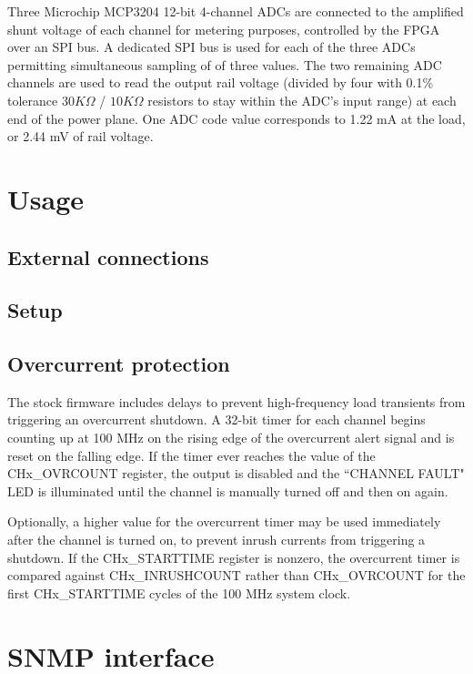 \documentclass{article}
\begin{document}
Three Microchip MCP3204 12-bit 4-channel ADCs are connected to the amplified shunt voltage of each channel for metering
purposes, controlled by the FPGA over an SPI bus. A dedicated SPI bus is used for each of the three ADCs permitting
simultaneous sampling of of three values. The two remaining ADC channels are used to read the output rail voltage
(divided by four with 0.1\% tolerance $30K\Omega$ / $10K\Omega$ resistors to stay within the ADC's input range) at each
end of the power plane. One ADC code value corresponds to 1.22 mA at the load, or 2.44 mV of rail voltage.

\pagebreak
\section{Usage}

\subsection{External connections}

\subsection{Setup}

\subsection{Overcurrent protection}

The stock firmware includes delays to prevent high-frequency load transients from triggering an overcurrent 
shutdown. A 32-bit timer for each channel begins counting up at 100 MHz on the rising edge of the overcurrent alert 
signal and is reset on the falling edge. If the timer ever reaches the value of the CHx\_OVRCOUNT register, the 
output is disabled and the ``CHANNEL FAULT" LED is illuminated until the channel is manually turned off and then on 
again.

Optionally, a higher value for the overcurrent timer may be used immediately after the channel is turned on, to 
prevent inrush currents from triggering a shutdown. If the CHx\_STARTTIME register is nonzero, the overcurrent timer 
is compared against CHx\_INRUSHCOUNT rather than CHx\_OVRCOUNT for the first CHx\_STARTTIME cycles of the 100 MHz system
clock.

\pagebreak
\section{SNMP interface}
\end{document}
